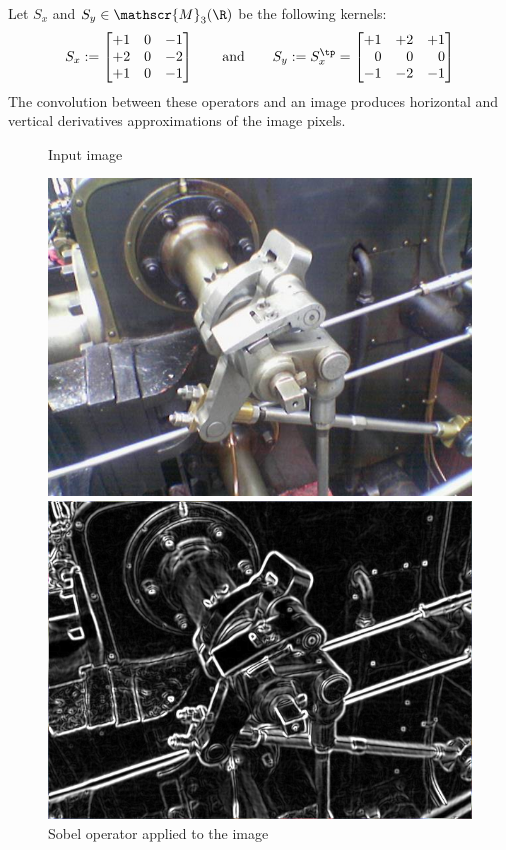 \begin{example}
    Let $S_x$ and $S_y\in\mathscr{M}_{3}(\R)$ be the following kernels:
    \begin{equation*}
        S_x := \begin{bmatrix}
            +1 & 0 & -1\\
            +2 & 0 & -2\\
            +1 & 0 & -1
        \end{bmatrix}
        \qquad\textnormal{and}\qquad
        S_y := S_x^\tp = \begin{bmatrix}
            +1 & +2 & +1\\
            \phantom{+}0 & \phantom{+}0 & \phantom{+}0\\
            -1 & -2 & -1
        \end{bmatrix}
    \end{equation*}
    The convolution between these operators and an image produces horizontal and vertical derivatives approximations of the image pixels.

    \begin{figure}[H]
        \centering
    
        \begin{minipage}{0.4\textwidth}
            \centering
            \caption*{Input image}
            \includegraphics[width=.7\textwidth]{images/pre-sobel.png}
        \end{minipage}
        \begin{minipage}{0.4\textwidth}
            \centering
            \caption*{Sobel operator applied to the image}
            \includegraphics[width=.7\textwidth]{images/post-sobel.png}
        \end{minipage}
        

\end{figure}
\end{example}
